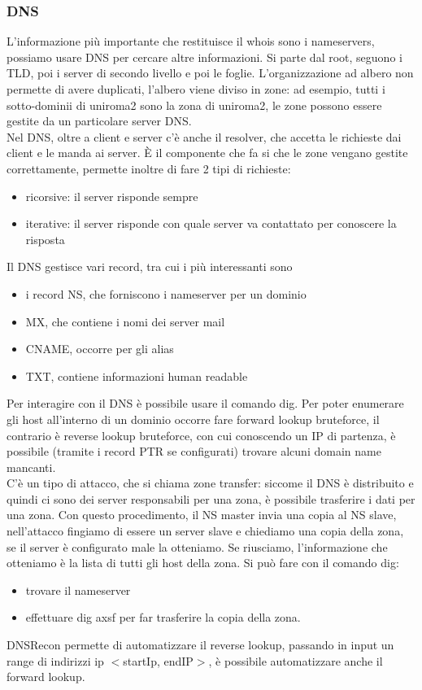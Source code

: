 \documentclass{article}
\begin{document}
\subsubsection{DNS}
L'informazione più importante che restituisce il \textsf{whois} sono i nameservers, possiamo usare DNS per cercare altre informazioni. 
Si parte dal root, seguono i TLD, poi i server di secondo livello e poi le foglie. L'organizzazione ad albero non permette di avere duplicati, l'albero viene diviso in zone: ad esempio, tutti i sotto-dominii di uniroma2 sono la zona di uniroma2, le zone possono essere gestite da un particolare server DNS.\\ Nel DNS, oltre a client e server c'è anche il resolver, che accetta le richieste dai client e le manda ai server. È il componente che fa si che le zone vengano gestite correttamente, permette inoltre di fare 2 tipi di richieste:
\begin{itemize}
\item ricorsive: il server risponde sempre
\item iterative: il server risponde con quale server va contattato per conoscere la risposta
\end{itemize}
Il DNS gestisce vari record, tra cui i più interessanti sono 
\begin{itemize}
\item i record NS, che forniscono i nameserver per un dominio
\item MX, che contiene i nomi dei server mail
\item CNAME, occorre per gli alias
\item TXT, contiene informazioni human readable
\end{itemize}
Per interagire con il DNS è possibile usare il comando \textsf{dig}. Per poter enumerare gli host all'interno di un dominio occorre fare forward lookup bruteforce, il contrario è reverse lookup bruteforce, con cui conoscendo un IP di partenza, è possibile (tramite i record PTR se configurati) trovare alcuni domain name mancanti.\\ C'è un tipo di attacco, che si chiama zone transfer: siccome il DNS è distribuito e quindi ci sono dei server responsabili per una zona, è possibile trasferire i dati per una zona. Con questo procedimento, il NS master invia una copia al NS slave, nell'attacco fingiamo di essere un server slave e chiediamo una copia della zona, se il server è configurato male la otteniamo. Se riusciamo, l'informazione che otteniamo è la lista di tutti gli host della zona. Si può fare con il comando \textsf{dig}:
\begin{itemize}
\item trovare il nameserver
\item effettuare \textsf{dig axsf} per far trasferire la copia della zona.
\end{itemize}
DNSRecon permette di automatizzare il reverse lookup, passando in input un range di indirizzi ip $<$startIp, endIP$>$, è possibile automatizzare anche il forward lookup.
\end{document}
